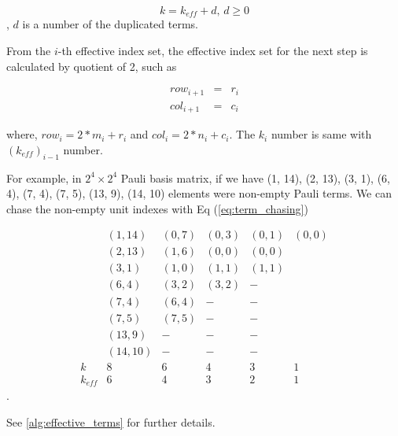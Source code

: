 \documentclass[twocolumn]{article}
\begin{document}
\begin{equation}
    k = k_{eff} + d,\, d \geq 0
\end{equation}, $d$ is a number of the duplicated terms.

From the $i$-th effective index set, the effective index set for the next step is calculated by
quotient of 2, such as 

\begin{equation}
    \label{eq:term_chasing}
    \begin{array}{ccc}
        row_{i+1}&=& r_i \\
        col_{i+1}&=& c_i
    \end{array}
\end{equation}

where, $row_i = 2*m_i + r_i$ and $col_i = 2*n_i + c_i$.
The $k_i$ number is same with $(k_{eff})_{i-1}$ number. 

For example, in $2^4 \times 2^4$ Pauli basis matrix, 
if we have 
(1, 14), 
(2, 13), 
(3, 1), 
(6, 4),
(7, 4),
(7, 5),
(13, 9),
(14, 10) elements 
were non-empty Pauli terms. 
We can chase the non-empty unit indexes with Eq (\ref{eq:term_chasing})

\begin{equation}
    \begin{array}{lccccc}
                & (1, 14)     & (0, 7)   &  (0, 3)& (0,1)&(0,0)\\
                & (2, 13)     & (1, 6)   &  (0, 0)& (0,0)&\\
                & (3, 1)      & (1, 0)   &  (1, 1)& (1,1)&\\
                & (6, 4)      & (3, 2)   &  (3, 2)& -    &\\
                & (7, 4)      & (6, 4)   &  -     & -    &\\
                & (7, 5)      & (7, 5)   &  -     & -    &\\
                & (13, 9)     & -        &  -     & -    &\\
                & (14, 10)    & -        &  -     & -    &\\
       k        & 8           & 6        &  4     & 3    & 1\\
       k_{eff}  & 6           & 4        &  3     & 2    & 1
    \end{array}
\end{equation}.

See \ref{alg:effective_terms} for further details.

\end{document}
